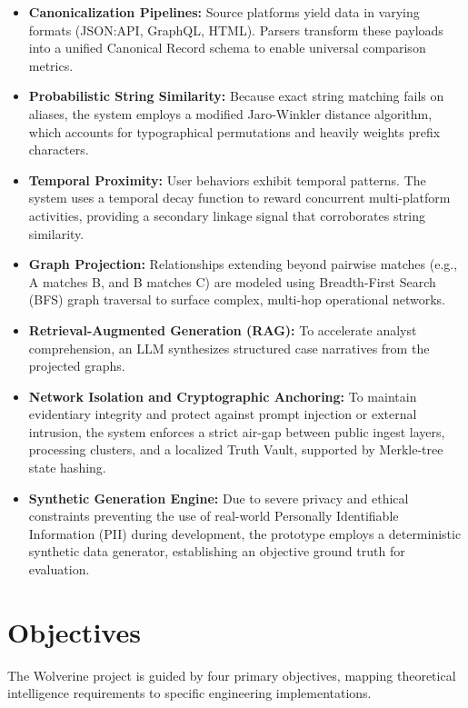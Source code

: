 \begin{itemize}
    \item \textbf{Canonicalization Pipelines:} Source platforms yield data in varying formats (JSON:API, GraphQL, HTML). Parsers transform these payloads into a unified Canonical Record schema to enable universal comparison metrics.
    \item \textbf{Probabilistic String Similarity:} Because exact string matching fails on aliases, the system employs a modified Jaro-Winkler distance algorithm, which accounts for typographical permutations and heavily weights prefix characters.
    \item \textbf{Temporal Proximity:} User behaviors exhibit temporal patterns. The system uses a temporal decay function to reward concurrent multi-platform activities, providing a secondary linkage signal that corroborates string similarity.
    \item \textbf{Graph Projection:} Relationships extending beyond pairwise matches (e.g., A matches B, and B matches C) are modeled using Breadth-First Search (BFS) graph traversal to surface complex, multi-hop operational networks.
    \item \textbf{Retrieval-Augmented Generation (RAG):} To accelerate analyst comprehension, an LLM synthesizes structured case narratives from the projected graphs.
    \item \textbf{Network Isolation and Cryptographic Anchoring:} To maintain evidentiary integrity and protect against prompt injection or external intrusion, the system enforces a strict air-gap between public ingest layers, processing clusters, and a localized Truth Vault, supported by Merkle-tree state hashing.
    \item \textbf{Synthetic Generation Engine:} Due to severe privacy and ethical constraints preventing the use of real-world Personally Identifiable Information (PII) during development, the prototype employs a deterministic synthetic data generator, establishing an objective ground truth for evaluation.
\end{itemize}

\section{Objectives}
\label{sec:intro-objectives}
The Wolverine project is guided by four primary objectives, mapping theoretical intelligence requirements to specific engineering implementations.

